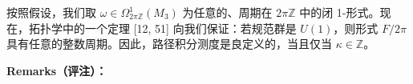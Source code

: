 按照假设，我们取 $\omega\in\Omega^{1}_{2\pi\mathbb{Z}}(M_3)$ 为任意的、周期在 $2\pi\mathbb{Z}$ 中的闭 1-形式。现在，拓扑学中的一个定理 [12, 51] 向我们保证：若规范群是 $U(1)$，则形式 $F/2\pi$ 具有任意的整数周期。因此，路径积分测度是良定义的，当且仅当 $\kappa\in\mathbb{Z}$。


\medskip\noindent\textbf{Remarks（评注）：}
